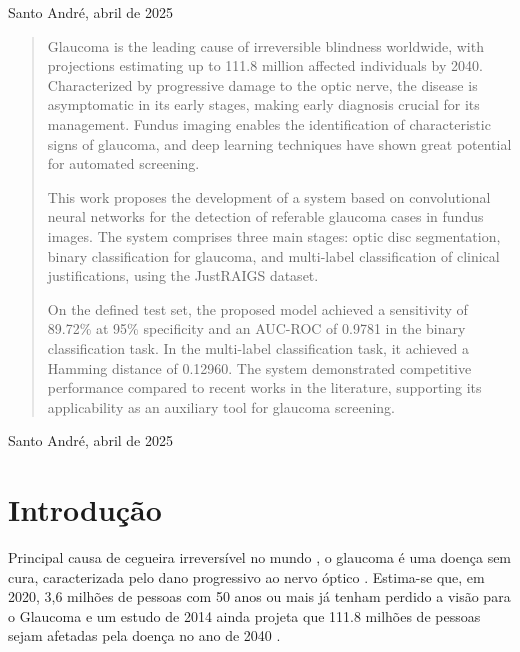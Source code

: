 \documentclass[12pt]{article}
\begin{document}
\begin{center}
Santo André, abril de 2025
\end{center}

\newpage


\begin{center}
\end{center}

\begin{quote}

Glaucoma is the leading cause of irreversible blindness worldwide, with projections estimating up to 111.8 million affected individuals by 2040. Characterized by progressive damage to the optic nerve, the disease is asymptomatic in its early stages, making early diagnosis crucial for its management. Fundus imaging enables the identification of characteristic signs of glaucoma, and deep learning techniques have shown great potential for automated screening.

This work proposes the development of a system based on convolutional neural networks for the detection of referable glaucoma cases in fundus images. The system comprises three main stages: optic disc segmentation, binary classification for glaucoma, and multi-label classification of clinical justifications, using the JustRAIGS dataset.

On the defined test set, the proposed model achieved a sensitivity of 89.72\% at 95\% specificity and an AUC-ROC of 0.9781 in the binary classification task. In the multi-label classification task, it achieved a Hamming distance of 0.12960. The system demonstrated competitive performance compared to recent works in the literature, supporting its applicability as an auxiliary tool for glaucoma screening.

\end{quote}

\begin{center}
Santo André, abril de 2025
\end{center}

\newpage

\tableofcontents

\newpage


\section{Introdução}
\label{sec:introducao}

Principal causa de cegueira irreversível no mundo \cite{steinmetz_causes_2021}, o glaucoma é uma doença sem cura, caracterizada pelo dano progressivo ao nervo óptico \cite{who_2019}. Estima-se que, em 2020, 3,6 milhões de pessoas com 50 anos ou mais já tenham perdido a visão para o Glaucoma \cite{steinmetz_causes_2021} e um estudo de 2014 ainda projeta que 111.8 milhões de pessoas sejam afetadas pela doença no ano de 2040 \cite{tham_global_2014}.
\end{document}
